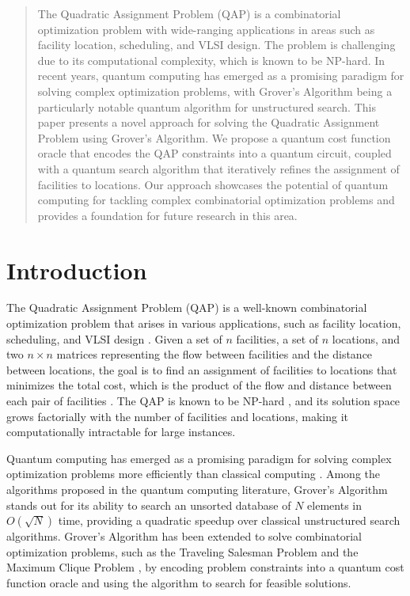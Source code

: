\begin{abstract}
The Quadratic Assignment Problem (QAP) is a combinatorial optimization problem with wide-ranging applications in areas such as facility location, scheduling, and VLSI design. The problem is challenging due to its computational complexity, which is known to be NP-hard. In recent years, quantum computing has emerged as a promising paradigm for solving complex optimization problems, with Grover's Algorithm being a particularly notable quantum algorithm for unstructured search. This paper presents a novel approach for solving the Quadratic Assignment Problem using Grover's Algorithm. We propose a quantum cost function oracle that encodes the QAP constraints into a quantum circuit, coupled with a quantum search algorithm that iteratively refines the assignment of facilities to locations. Our approach showcases the potential of quantum computing for tackling complex combinatorial optimization problems and provides a foundation for future research in this area.

\end{abstract}

\section{Introduction}

The Quadratic Assignment Problem (QAP) is a well-known combinatorial optimization problem that arises in various applications, such as facility location, scheduling, and VLSI design \cite{koopmans1957assignment}. Given a set of $n$ facilities, a set of $n$ locations, and two $n \times n$ matrices representing the flow between facilities and the distance between locations, the goal is to find an assignment of facilities to locations that minimizes the total cost, which is the product of the flow and distance between each pair of facilities \cite{burkard2012quadratic}. The QAP is known to be NP-hard \cite{sahni1976approximate}, and its solution space grows factorially with the number of facilities and locations, making it computationally intractable for large instances.

Quantum computing has emerged as a promising paradigm for solving complex optimization problems more efficiently than classical computing \cite{nielsen2010quantum}. Among the algorithms proposed in the quantum computing literature, Grover's Algorithm \cite{grover1996fast} stands out for its ability to search an unsorted database of $N$ elements in $O(\sqrt{N})$ time, providing a quadratic speedup over classical unstructured search algorithms. Grover's Algorithm has been extended to solve combinatorial optimization problems, such as the Traveling Salesman Problem \cite{paparo2014quantum} and the Maximum Clique Problem \cite{park2008quantum}, by encoding problem constraints into a quantum cost function oracle and using the algorithm to search for feasible solutions.

